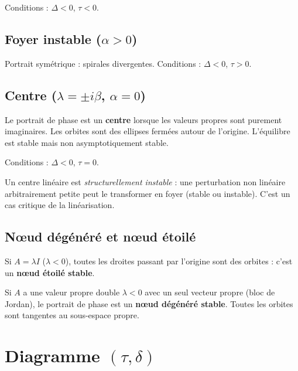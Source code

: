 Conditions : $\Delta < 0$, $\tau < 0$.

\subsection{Foyer instable ($\alpha > 0$)}

Portrait sym\'etrique : spirales divergentes. Conditions : $\Delta < 0$, $\tau > 0$.

\subsection{Centre ($\lambda = \pm i\beta$, $\alpha = 0$)}

\begin{definition}[Centre]
Le portrait de phase est un \textbf{centre} lorsque les valeurs propres sont
purement imaginaires. Les orbites sont des ellipses ferm\'ees autour de l'origine.
L'\'equilibre est stable mais non asymptotiquement stable.
\end{definition}

Conditions : $\Delta < 0$, $\tau = 0$.

\begin{attention}[title=\textbf{Centre et perturbations non lin\'eaires}]
Un centre lin\'eaire est \emph{structurellement instable} : une perturbation
non lin\'eaire arbitrairement petite peut le transformer en foyer
(stable ou instable). C'est un cas critique de la lin\'earisation.
\end{attention}

\subsection{N\oe ud d\'eg\'en\'er\'e et n\oe ud \'etoil\'e}

\begin{definition}[N\oe ud \'etoil\'e]
Si $A = \lambda I$ ($\lambda < 0$), toutes les droites passant par l'origine
sont des orbites : c'est un \textbf{n\oe ud \'etoil\'e stable}.
\end{definition}

\begin{definition}[N\oe ud d\'eg\'en\'er\'e]
Si $A$ a une valeur propre double $\lambda < 0$ avec un seul vecteur propre
(bloc de Jordan), le portrait de phase est un \textbf{n\oe ud d\'eg\'en\'er\'e
stable}. Toutes les orbites sont tangentes au sous-espace propre.
\end{definition}

\section{Diagramme $(\tau, \delta)$}

